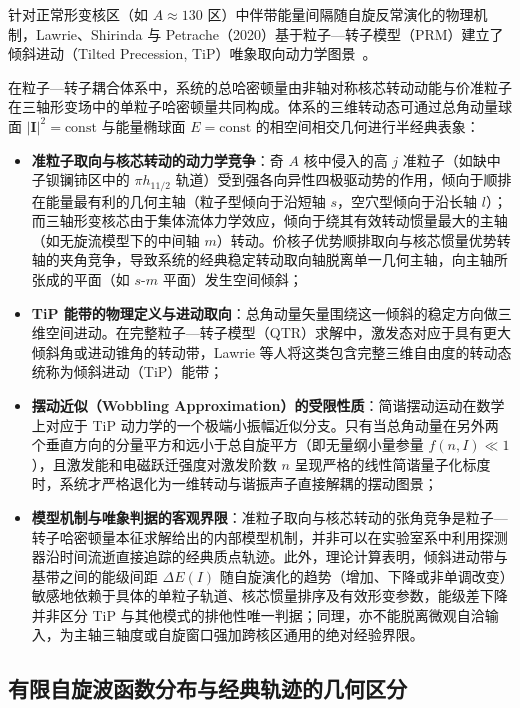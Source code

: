 针对正常形变核区（如 $A \approx 130$ 区）中伴带能量间隔随自旋反常演化的物理机制，Lawrie、Shirinda 与 Petrache（2020）基于粒子—转子模型（PRM）建立了倾斜进动（Tilted Precession, TiP）唯象取向动力学图景~\cite{lawrie-2020-tilted-precession-wobbling}。

在粒子—转子耦合体系中，系统的总哈密顿量由非轴对称核芯转动动能与价准粒子在三轴形变场中的单粒子哈密顿量共同构成。体系的三维转动态可通过总角动量球面 $|\mathbf{I}|^2 = \text{const}$ 与能量椭球面 $E = \text{const}$ 的相空间相交几何进行半经典表象：
\begin{itemize}
\item \textbf{准粒子取向与核芯转动的动力学竞争}：奇 $A$ 核中侵入的高 $j$ 准粒子（如缺中子钡镧铈区中的 $\pi h_{11/2}$ 轨道）受到强各向异性四极驱动势的作用，倾向于顺排在能量最有利的几何主轴（粒子型倾向于沿短轴 $s$，空穴型倾向于沿长轴 $l$）；而三轴形变核芯由于集体流体力学效应，倾向于绕其有效转动惯量最大的主轴（如无旋流模型下的中间轴 $m$）转动。价核子优势顺排取向与核芯惯量优势转轴的夹角竞争，导致系统的经典稳定转动取向轴脱离单一几何主轴，向主轴所张成的平面（如 $s$-$m$ 平面）发生空间倾斜；
\item \textbf{TiP 能带的物理定义与进动取向}：总角动量矢量围绕这一倾斜的稳定方向做三维空间进动。在完整粒子—转子模型（QTR）求解中，激发态对应于具有更大倾斜角或进动锥角的转动带，Lawrie 等人将这类包含完整三维自由度的转动态统称为倾斜进动（TiP）能带；
\item \textbf{摆动近似（Wobbling Approximation）的受限性质}：简谐摆动运动在数学上对应于 TiP 动力学的一个极端小振幅近似分支。只有当总角动量在另外两个垂直方向的分量平方和远小于总自旋平方（即无量纲小量参量 $f(n, I) \ll 1$），且激发能和电磁跃迁强度对激发阶数 $n$ 呈现严格的线性简谐量子化标度时，系统才严格退化为一维转动与谐振声子直接解耦的摆动图景；
\item \textbf{模型机制与唯象判据的客观界限}：准粒子取向与核芯转动的张角竞争是粒子—转子哈密顿量本征求解给出的内部模型机制，并非可以在实验室系中利用探测器沿时间流逝直接追踪的经典质点轨迹。此外，理论计算表明，倾斜进动带与基带之间的能级间距 $\Delta E(I)$ 随自旋演化的趋势（增加、下降或非单调改变）敏感地依赖于具体的单粒子轨道、核芯惯量排序及有效形变参数，能级差下降并非区分 TiP 与其他模式的排他性唯一判据；同理，亦不能脱离微观自洽输入，为主轴三轴度或自旋窗口强加跨核区通用的绝对经验界限。
\end{itemize}

\subsection{有限自旋波函数分布与经典轨迹的几何区分}\label{sec:3-4-3}

